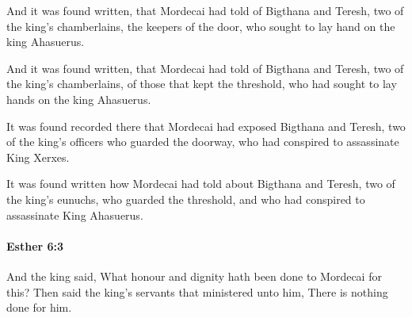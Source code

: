 			And it was found written, that Mordecai had told of Bigthana and Teresh, two of the king’s chamberlains, the keepers of the door, who sought to lay hand on the king Ahasuerus.

			\begin{versebox}
					\item[BHS] 
					\item[LXX] 
					\item[ASV] And it was found written, that Mordecai had told of Bigthana and Teresh, two of the king's chamberlains, of those that kept the threshold, who had sought to lay hands on the king Ahasuerus.
					\item[NIV] It was found recorded there that Mordecai had exposed Bigthana and Teresh, two of the king’s officers who guarded the doorway, who had conspired to assassinate King Xerxes.
					\item[NRSV] It was found written how Mordecai had told about Bigthana and Teresh, two of the king’s eunuchs, who guarded the threshold, and who had conspired to assassinate King Ahasuerus.
			\end{versebox}

		\paragraph{Esther 6:3} %
			\label{ESTHER-6-3}

			And the king said, What honour and dignity hath been done to Mordecai for this? Then said the king’s servants that ministered unto him, There is nothing done for him.

